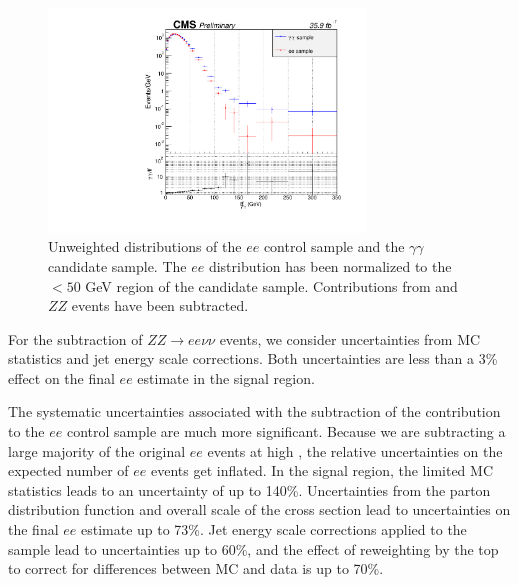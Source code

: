 \begin{figure}[h]
\begin{center}
\includegraphics[width=0.75\textwidth]{Figures/Appendix/compare_ee_gg_unweighted.pdf}
\end{center}
\caption{Unweighted \ETmiss distributions of the $ee$ control sample and the $\gamma\gamma$ candidate sample.
The $ee$ distribution has been normalized to the \ETmiss$<50$ GeV region of the candidate sample. Contributions 
from \ttbar and $ZZ$ events have been subtracted.}
\label{fig:eeUnweighted}
\end{figure}


For the subtraction of $ZZ \rightarrow ee\nu\nu$ events, 
we consider uncertainties from
MC statistics and jet energy scale corrections.
Both uncertainties are less than a 3\% effect
on the final $ee$ estimate in the signal region.

The systematic uncertainties associated with 
the subtraction of the \ttbar contribution to the $ee$ control
sample are much more significant. 
Because we are subtracting a large majority of the
original $ee$ events at high \ETmiss, the relative
uncertainties on the expected number of $ee$ events get inflated.
In the signal region, the limited MC \ttbar statistics
leads to an uncertainty of up to 140\%. Uncertainties
from the parton distribution function and overall
scale of the cross section lead to uncertainties
on the final $ee$ estimate up to 73\%.
Jet energy scale corrections
applied to the \ttbar sample lead to uncertainties up to
60\%, and the effect of reweighting by the
top \pt to correct for differences between
MC and data is up to 70\%.


